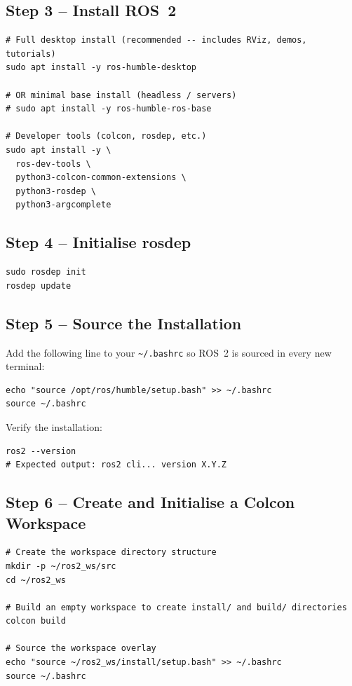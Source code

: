 \documentclass[12pt,a4paper]{article}
\newcommand{\code}[1]{\texttt{#1}}
\begin{document}
\subsection{Step 3 -- Install ROS~2}

\begin{lstlisting}[style=bash]
# Full desktop install (recommended -- includes RViz, demos, tutorials)
sudo apt install -y ros-humble-desktop

# OR minimal base install (headless / servers)
# sudo apt install -y ros-humble-ros-base

# Developer tools (colcon, rosdep, etc.)
sudo apt install -y \
  ros-dev-tools \
  python3-colcon-common-extensions \
  python3-rosdep \
  python3-argcomplete
\end{lstlisting}

\subsection{Step 4 -- Initialise rosdep}

\begin{lstlisting}[style=bash]
sudo rosdep init
rosdep update
\end{lstlisting}

\subsection{Step 5 -- Source the Installation}

Add the following line to your \code{\textasciitilde/.bashrc} so ROS~2 is
sourced in every new terminal:

\begin{lstlisting}[style=bash]
echo "source /opt/ros/humble/setup.bash" >> ~/.bashrc
source ~/.bashrc
\end{lstlisting}

Verify the installation:
\begin{lstlisting}[style=bash]
ros2 --version
# Expected output: ros2 cli... version X.Y.Z
\end{lstlisting}

\subsection{Step 6 -- Create and Initialise a Colcon Workspace}

\begin{lstlisting}[style=bash]
# Create the workspace directory structure
mkdir -p ~/ros2_ws/src
cd ~/ros2_ws

# Build an empty workspace to create install/ and build/ directories
colcon build

# Source the workspace overlay
echo "source ~/ros2_ws/install/setup.bash" >> ~/.bashrc
source ~/.bashrc
\end{lstlisting}
\end{document}
